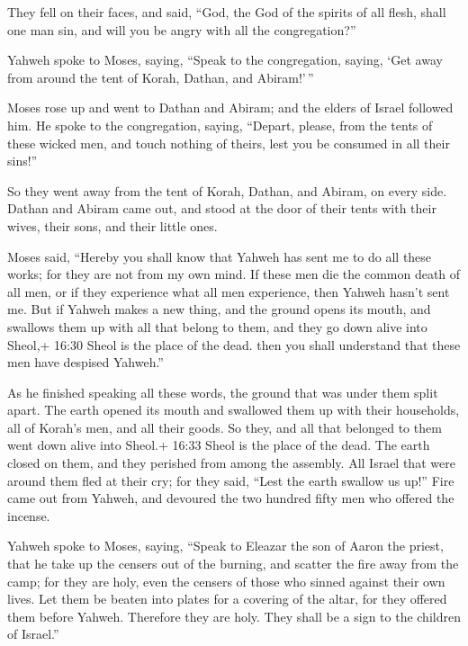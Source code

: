  They fell on their faces, and said, ``God, the God of the
spirits of all flesh, shall one man sin, and will you be angry with all
the congregation?''

 Yahweh spoke to Moses, saying,  ``Speak to
the congregation, saying, `Get away from around the tent of Korah,
Dathan, and Abiram!'\,''

 Moses rose up and went to Dathan and Abiram; and the
elders of Israel followed him.  He spoke to the
congregation, saying, ``Depart, please, from the tents of these wicked
men, and touch nothing of theirs, lest you be consumed in all their
sins!''

 So they went away from the tent of Korah, Dathan, and
Abiram, on every side. Dathan and Abiram came out, and stood at the door
of their tents with their wives, their sons, and their little ones.

 Moses said, ``Hereby you shall know that Yahweh has sent
me to do all these works; for they are not from my own mind.
 If these men die the common death of all men, or if they
experience what all men experience, then Yahweh hasn't sent me.
 But if Yahweh makes a new thing, and the ground opens its
mouth, and swallows them up with all that belong to them, and they go
down alive into Sheol,+ 16:30 Sheol is the place of the dead. then you
shall understand that these men have despised Yahweh.''

 As he finished speaking all these words, the ground that
was under them split apart.  The earth opened its mouth and
swallowed them up with their households, all of Korah's men, and all
their goods.  So they, and all that belonged to them went
down alive into Sheol.+ 16:33 Sheol is the place of the dead. The earth
closed on them, and they perished from among the assembly. 
All Israel that were around them fled at their cry; for they said,
``Lest the earth swallow us up!''  Fire came out from
Yahweh, and devoured the two hundred fifty men who offered the incense.

 Yahweh spoke to Moses, saying,  ``Speak to
Eleazar the son of Aaron the priest, that he take up the censers out of
the burning, and scatter the fire away from the camp; for they are holy,
 even the censers of those who sinned against their own
lives. Let them be beaten into plates for a covering of the altar, for
they offered them before Yahweh. Therefore they are holy. They shall be
a sign to the children of Israel.''


